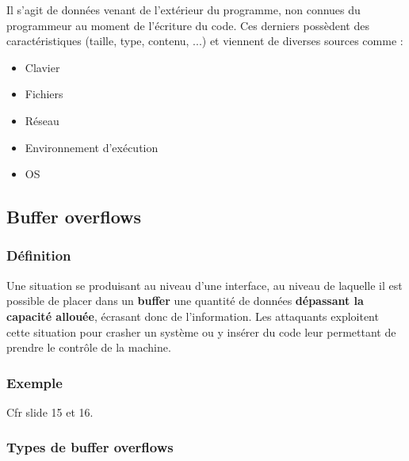 \documentclass{report}
\begin{document}
Il s'agit de données venant de l'extérieur du programme, non connues du programmeur au moment de l'écriture du code. Ces derniers possèdent des caractéristiques (taille, type, contenu, ...) et viennent de diverses sources comme :

\begin{itemize}
    \item Clavier
    \item Fichiers
    \item Réseau
    \item Environnement d'exécution
    \item OS
\end{itemize}

\subsection{Buffer overflows}

\subsubsection{Définition}

Une situation se produisant au niveau d’une interface, au niveau de laquelle il est possible de placer dans un \textbf{buffer} une quantité de données \textbf{dépassant la capacité allouée}, écrasant donc de l’information. Les attaquants exploitent cette situation pour crasher un système ou y insérer du code leur permettant de prendre le contrôle de la machine.\\

\subsubsection{Exemple}
Cfr slide 15 et 16.

\subsubsection{Types de buffer overflows}
\end{document}
